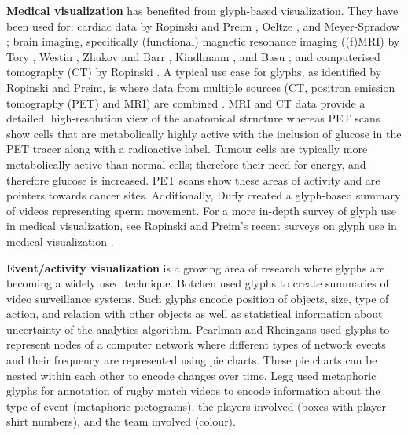 \textbf{Medical visualization} has benefited from glyph-based visualization. 
They have been used for:
cardiac data by Ropinski and Preim \cite{ropinski08,ropinski11}, Oeltze \etal \cite{oeltze2008glyph}, and Meyer-Spradow \etal \cite{meyer2008glyph};
brain imaging, specifically (functional) magnetic resonance imaging ((f)MRI) by Tory \etal\cite{tory2001visualization}, Westin \etal \cite{westin02processing}, Zhukov and Barr \cite{zhukov2003heart}, Kindlmann \cite{kindlmann2004superquadric}, and Basu \etal \cite{basu2006rician};
and computerised tomography (CT) by Ropinski \etal \cite{ropinski2007surface}. 
A typical use case for glyphs, as identified by Ropinski and Preim, is where data from multiple sources (CT, positron emission tomography (PET) and MRI) are combined \cite{ropinski08}. 
MRI and CT data provide a detailed, high-resolution view of the anatomical structure whereas PET scans show cells that are metabolically highly active with the inclusion of glucose in the PET tracer along with a radioactive label. 
Tumour cells are typically more metabolically active than normal cells; therefore their need for energy, and therefore glucose is increased.
PET scans show these areas of activity and are pointers towards cancer sites. 
Additionally, Duffy \etal \cite{Duffy:2014:TVCG} created a glyph-based summary of videos representing sperm movement. 
For a more in-depth survey of glyph use in medical visualization, see Ropinski and Preim's recent surveys on glyph use in medical visualization \cite{ropinski08,ropinski11}.

\textbf{Event/activity visualization} is a growing area of research where glyphs are becoming a widely used technique. 
Botchen \etal \cite{botchen08ActionBasedVideo} used glyphs to create summaries of video surveillance systems. 
Such glyphs encode position of objects, size, type of action, and relation with other objects as well as statistical information about uncertainty of the analytics algorithm. 
Pearlman and Rheingans \cite{pearlman08} used glyphs to represent nodes of a computer network where different types of network events and their frequency are represented using pie charts. 
These pie charts can be nested within each other to encode changes over time. 
Legg \etal \cite{Legg:2012:CGF} used metaphoric glyphs for annotation of rugby match videos to encode information about the type of event (metaphoric pictograms), the players involved (boxes with player shirt numbers), and the team involved (colour). 

